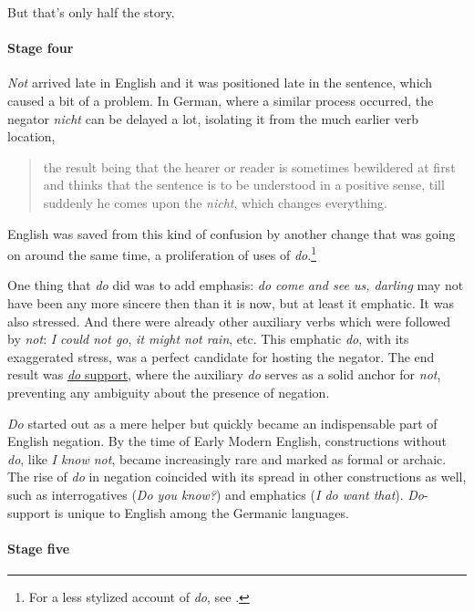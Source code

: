 But that's only half the story.

\paragraph{Stage four}

\textit{Not} arrived late in English and it was positioned late in the sentence, which caused a bit of a problem. In German, where a similar process occurred, the negator \textit{nicht} can be delayed a lot, isolating it from the much earlier verb location,

\begin{quote}
    the result being that the hearer or reader is sometimes bewildered at first and thinks that the sentence is to be understood in a positive sense, till suddenly he comes upon the \textit{nicht}, which changes everything. \\ \citep[10]{Jespersen1917}
\end{quote}

English was saved from this kind of confusion by another change that was going on around the same time, a proliferation of uses of \textit{do}.\footnote{For a less stylized account of \textit{do}, see \citet{Denison1985}.}

One thing that \textit{do} did was to add emphasis: \textit{do come and see us, darling} may not have been any more sincere then than it is now, but at least it  emphatic. It was also stressed. And there were already other auxiliary verbs which were followed by \textit{not}: \textit{I could not go}, \textit{it might not rain}, etc. This emphatic \textit{do}, with its exaggerated stress, was a perfect candidate for hosting the negator. The end result was \hyperref[sec:sec:basic-do-support]{\textit{do} support}, where the auxiliary \textit{do} serves as a solid anchor for \textit{not}, preventing any ambiguity about the presence of negation.

\textit{Do} started out as a mere helper but quickly became an indispensable part of English negation. By the time of Early Modern English, constructions without \textit{do}, like \textit{I know not}, became increasingly rare and marked as formal or archaic. The rise of \textit{do} in negation coincided with its spread in other constructions as well, such as interrogatives (\textit{Do you know?}) and emphatics (\textit{I do want that}). \textit{Do}-support is unique to English among the Germanic languages.

\paragraph{Stage five}

